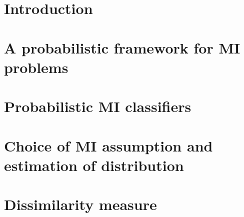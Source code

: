 \documentclass[preprint,12pt]{elsarticle}
\begin{document}
\newcommand{\cpos}{\text{\scriptsize{{\it POS}}}}
\newcommand{\cneg}{\text{\scriptsize{{\it NEG}}}}


\begin{frontmatter}







\end{frontmatter}

\clearpage

\section{Introduction} \label{sec:Introduction} 


\section{A probabilistic framework for MI problems} \label{sec:Probabilistic} 


% 

% 

\section{Probabilistic MI classifiers} \label{sec:Classifier}


\section{Choice of MI assumption and estimation of distribution} \label{sec:Distribution}


\section{Dissimilarity measure} \label{sec:Dissimilarity}

\end{document}
